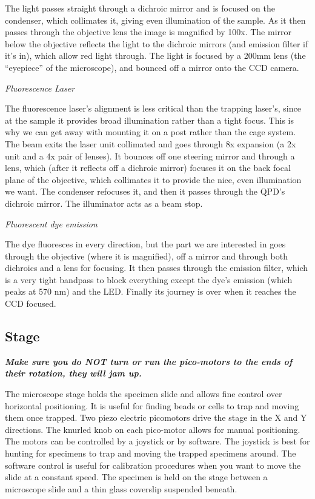 \documentclass{../lab}
\begin{document}
The light passes straight through a dichroic mirror and is focused on the condenser, which collimates it, giving even illumination of the sample. As it then passes through the objective lens the image is magnified by 100x. The mirror below the objective reflects the light to the dichroic mirrors (and emission filter if it's in), which allow red light through. The light is focused by a 200mm lens (the ``eyepiece'' of the microscope), and bounced off a mirror onto the CCD camera.

\emph{Fluorescence Laser}

The fluorescence laser's alignment is less critical than the trapping laser's, since at the sample it provides broad illumination rather than a tight focus. This is why we can get away with mounting it on a post rather than the cage system. The beam exits the laser unit collimated and goes through 8x expansion (a 2x unit and a 4x pair of lenses). It bounces off one steering mirror and through a lens, which (after it reflects off a dichroic mirror) focuses it on the back focal plane of the objective, which collimates it to provide the nice, even illumination we want. The condenser refocuses it, and then it passes through the QPD's dichroic mirror. The illuminator acts as a beam stop.

\emph{Fluorescent dye emission}

The dye fluoresces in every direction, but the part we are interested in goes through the objective (where it is magnified), off a mirror and through both dichroics and a lens for focusing. It then passes through the emission filter, which is a very tight bandpass to block everything except the dye's emission (which peaks at 570 nm) and the LED. Finally its journey is over when it reaches the CCD focused.

\newpage

\subsection{Stage}

\emph{\textbf{Make sure you do NOT turn or run the pico-motors to the ends of their rotation, they will jam up.}}

The microscope stage holds the specimen slide and allows fine control over horizontal positioning. It is useful for finding beads or cells to trap and moving them once trapped. Two piezo electric picomotors drive the stage in the X and Y directions. The knurled knob on each pico-motor allows for manual positioning. The motors can be controlled by a joystick or by software. The joystick is best for hunting for specimens to trap and moving the trapped specimens around. The software control is useful for calibration procedures when you want to move the slide at a constant speed. The specimen is held on the stage between a microscope slide and a thin glass coverslip suspended beneath.
\end{document}
